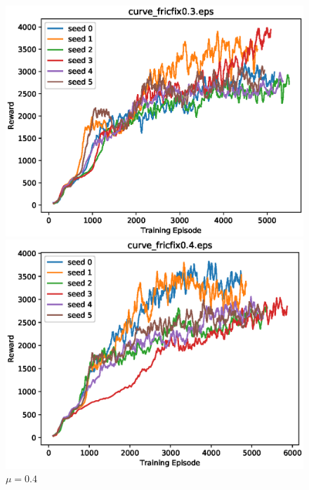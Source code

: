 \begin{figure}[p]
 \begin{minipage}{0.49\hsize}
  \begin{center}
 \includegraphics[width=.99\linewidth]{./fig/curve_fricfix0.3.eps}
  \caption{$\mu=0.3$
  }
  \end{center}
 \end{minipage}
 \begin{minipage}{0.49\hsize}
   \begin{center}
 \includegraphics[width=.99\linewidth]{./fig/curve_fricfix0.4.eps}
  \caption{$\mu=0.4$
     }
  \end{center}
 \end{minipage}
\end{figure}

